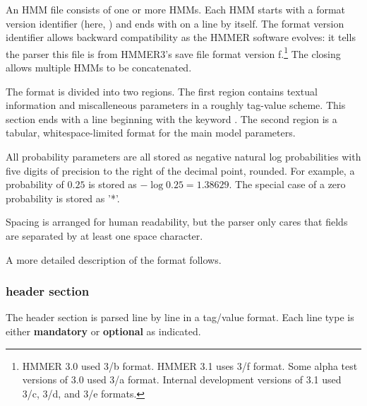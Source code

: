 An HMM file consists of one or more HMMs.  Each HMM starts with a
format version identifier (here, ) and ends with
\prog{//} on a line by itself.  The format version identifier allows
backward compatibility as the HMMER software evolves: it tells the
parser this file is from HMMER3's save file format version
f.\footnote{HMMER 3.0 used 3/b format. HMMER 3.1 uses 3/f format.
  Some alpha test versions of 3.0 used 3/a format. Internal
  development versions of 3.1 used 3/c, 3/d, and 3/e formats.}  The closing
\prog{//} allows multiple HMMs to be concatenated.

The format is divided into two regions. The first region contains
textual information and miscalleneous parameters in a roughly
tag-value scheme.  This section ends with a line beginning with the
keyword . The second region is a tabular, whitespace-limited
format for the main model parameters.

All probability parameters are all stored as negative natural log
probabilities with five digits of precision to the right of the
decimal point, rounded. For example, a probability of $0.25$ is stored
as $-\log 0.25 = 1.38629$. The special case of a zero probability is
stored as '*'.

Spacing is arranged for human readability, but the parser only cares
that fields are separated by at least one space character.

A more detailed description of the format follows.

\subsubsection{header section}

The header section is parsed line by line in a tag/value format. Each
line type is either \textbf{mandatory} or \textbf{optional} as
indicated. 

